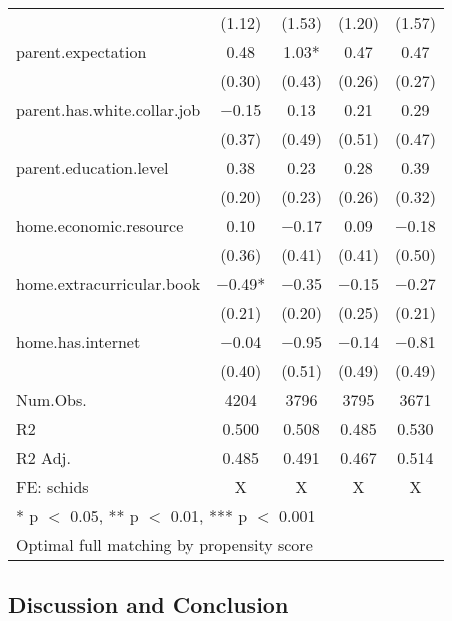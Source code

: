 \documentclass[
  man]{apa7}
\begin{document}
\begin{table}
\begin{tabular}[t]{lcccc}
 & (\num{1.12}) & (\num{1.53}) & (\num{1.20}) & (\num{1.57})\\
parent.expectation & \num{0.48} & \num{1.03}* & \num{0.47} & \num{0.47}\\
 & (\num{0.30}) & (\num{0.43}) & (\num{0.26}) & (\num{0.27})\\
parent.has.white.collar.job & \num{-0.15} & \num{0.13} & \num{0.21} & \num{0.29}\\
 & (\num{0.37}) & (\num{0.49}) & (\num{0.51}) & (\num{0.47})\\
parent.education.level & \num{0.38} & \num{0.23} & \num{0.28} & \num{0.39}\\
 & (\num{0.20}) & (\num{0.23}) & (\num{0.26}) & (\num{0.32})\\
home.economic.resource & \num{0.10} & \num{-0.17} & \num{0.09} & \num{-0.18}\\
 & (\num{0.36}) & (\num{0.41}) & (\num{0.41}) & (\num{0.50})\\
home.extracurricular.book & \num{-0.49}* & \num{-0.35} & \num{-0.15} & \num{-0.27}\\
 & (\num{0.21}) & (\num{0.20}) & (\num{0.25}) & (\num{0.21})\\
home.has.internet & \num{-0.04} & \num{-0.95} & \num{-0.14} & \num{-0.81}\\
 & (\num{0.40}) & (\num{0.51}) & (\num{0.49}) & (\num{0.49})\\
\midrule
Num.Obs. & \num{4204} & \num{3796} & \num{3795} & \num{3671}\\
R2 & \num{0.500} & \num{0.508} & \num{0.485} & \num{0.530}\\
R2 Adj. & \num{0.485} & \num{0.491} & \num{0.467} & \num{0.514}\\
FE: schids & X & X & X & X\\
\bottomrule
\multicolumn{5}{l}{\rule{0pt}{1em}* p $<$ 0.05, ** p $<$ 0.01, *** p $<$ 0.001}\\
\multicolumn{5}{l}{\rule{0pt}{1em}Optimal full matching by propensity score}\\
\end{tabular}
\end{table}

\hypertarget{discussion-and-conclusion}{%
\subsection{Discussion and Conclusion}\label{discussion-and-conclusion}}
\end{document}
